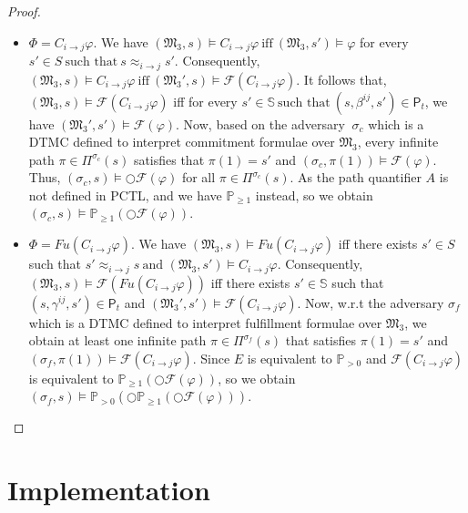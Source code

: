 \begin{proof}
\begin{itemize}
\item $\Phi = C_{i \rightarrow j} \varphi$. We have
$(\mathfrak{M_3},s)\models C_{i\rightarrow j}\varphi ~\text{iff}~
(\mathfrak{M_3},s') \models \varphi$ for every $s' \in S
~\textrm{such that}~ s\approx_{i \rightarrow j}s'$. Consequently,
$(\mathfrak{M_3},s) \models C_{i\rightarrow j} \varphi ~\text{iff}~
(\mathfrak{M_3'},s) \models \mathscr{F}(C_{i\rightarrow j}
\varphi)$. It follows that, $(\mathfrak{M_3},s) \models
\mathscr{F}(C_{i\rightarrow j}\varphi)$ iff for every $s' \in
\mathbb{S} ~\textrm{such that}~ (s,\beta^{ij},s') \in
\textsf{P}_t$, we have $(\mathfrak{M_3'},s') \models
\mathscr{F}(\varphi)$. Now, based on the adversary $~\sigma_c$
which is a DTMC defined to interpret commitment formulae over
$\mathfrak{M_3}$, every infinite path $\pi \in \Pi^{\sigma_c}(s)$
satisfies that $\pi(1)=s'$ and $(\sigma_c,\pi(1))\models
\mathscr{F}(\varphi)$. Thus, $(\sigma_c,s)\models
\bigcirc\mathscr{F}(\varphi)$ for all $\pi \in \Pi^{\sigma_c}(s)$.
As the path quantifier $A$ is not defined in PCTL, and we have
$\mathbb{P}_{\geq1}$ instead, so we obtain $(\sigma_c,s)\models
\mathbb{P}_{\geq1}(\bigcirc\mathscr{F}(\varphi))$.

\item $\Phi = Fu(C_{i \rightarrow j} \varphi)$. We have
$(\mathfrak{M_3},s)\models Fu(C_{i\rightarrow j}\varphi)$ iff there
exists $s'\in S$ such that $s'\approx_{i \rightarrow j}s~
\text{and~}(\mathfrak{M_3},s')\models C_{i \rightarrow j}\varphi$.
Consequently, $(\mathfrak{M_3},s)\models
\mathscr{F}(Fu(C_{i\rightarrow j}\varphi))$ iff there exists $s'
\in \mathbb{S}$ such that $(s,\gamma^{ij},s') \in \textsf{P}_t$
and $(\mathfrak{M_3'},s') \models \mathscr{F}(C_{i \rightarrow
j}\varphi)$. Now, w.r.t the adversary $\sigma_f$ which is a DTMC
defined to interpret fulfillment formulae over $\mathfrak{M_3}$, we
obtain at least one infinite path $\pi \in \Pi^{\sigma_f}(s)$ that
satisfies $\pi(1)=s'$ and $(\sigma_f,\pi(1))\models
\mathscr{F}(C_{i \rightarrow j}\varphi)$. Since $E$ is equivalent
to $\mathbb{P}_{>0}$ and $\mathscr{F}(C_{i \rightarrow j}\varphi)$
is equivalent to
$\mathbb{P}_{\geq1}(\bigcirc\mathscr{F}(\varphi))$, so we obtain
$(\sigma_f,s)\models \mathbb{P}_{>0}(\bigcirc\mathbb{P}_{\geq
1}(\bigcirc \mathscr{F}(\varphi)))$.
\end{itemize}
\end{proof}


\section{Implementation}\label{sec:implementation-cha5}

